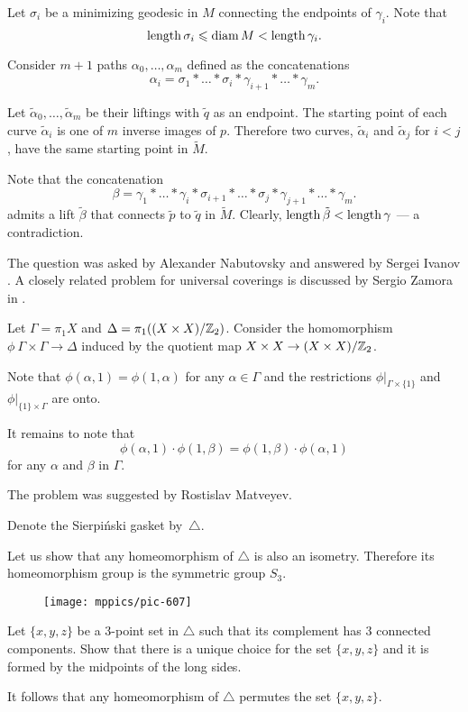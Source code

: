 Let $\sigma_i$ be a minimizing geodesic in $M$ connecting the endpoints of $\gamma_i$. 
Note that 
\[\operatorname{\rm length}\sigma_i\leqslant \operatorname{\rm diam}\nolimits M< \operatorname{\rm length}\gamma_i.\] 

Consider $m+1$ paths $\alpha_0,\dots,\alpha_m$ defined as the concatenations 
\[\alpha_i=\sigma_1{*}\dots{*}\sigma_i{*}\gamma_{i+1}{*}\dots{*}\gamma_m.\]

Let $\tilde\alpha_0,\dots,\tilde\alpha_m$ be their liftings
with $\tilde q$ as an endpoint.
The starting point of each curve $\tilde\alpha_i$ is one of $m$ inverse images of $p$. 
Therefore two curves, $\tilde\alpha_i$ and $\tilde\alpha_j$ for $i<j$, 
have the same starting point in $\tilde M$.

Note that the concatenation
\[\beta=\gamma_1{*}\dots{*}\gamma_i{*}\sigma_{i+1}{*}\dots{*}\sigma_j{*}\gamma_{j+1}{*}\dots{*}\gamma_m.\]
admits a lift $\tilde\beta$ that connects $\tilde p$ to $\tilde q$ in $\tilde M$.
Clearly, $\operatorname{\rm length} \tilde\beta<\operatorname{\rm length} \gamma$ --- a contradiction.
\qeds

The question was asked by Alexander  Nabutovsky
and answered by Sergei Ivanov \cite{ivanov}.
A closely related problem for universal coverings is discussed by Sergio Zamora in \cite{zamora}.



Let $\Gamma=\pi_1 X$ and $\Delta=\pi_1((X\times X)/\mathbb{Z}_2)$.
Consider the homomorphism $\phi\:\Gamma\times \Gamma\to \Delta$
induced by the quotient map $X\times X\z\to (X\times X)/\ZZ_2$.

Note that $\phi(\alpha,1)=\phi(1,\alpha)$ for any $\alpha\in \Gamma$ and the restrictions $\phi|_{\Gamma\times \{1\}}$ and $\phi|_{\{1\}\times\Gamma}$
are onto.

It remains to note that 
$$\phi(\alpha,1)\cdot\phi(1,\beta)=\phi(1,\beta)\cdot\phi(\alpha,1)$$
for any $\alpha$ and $\beta$ in $\Gamma$.
\qeds

 
The problem was suggested by Rostislav Matveyev.




Denote the Sierpi\'nski gasket by~$\triangle$.

Let us show that any homeomorphism of $\triangle$ is also an isometry.
Therefore its homeomorphism group is the symmetric group $S_3$. 

{

\begin{wrapfigure}{o}{23 mm}
\vskip-4mm
\centering
\texttt{[image: mppics/pic-607]}
\end{wrapfigure}
Let $\{x,y,z\}$ be a 3-point set in $\triangle$ such that its complement has 3 connected components.
Show that there is a unique choice for the set $\{x,y,z\}$ and 
it is formed by the midpoints of the long sides.

It follows that any homeomorphism of $\triangle$ permutes the set $\{x,y,z\}$.

}

